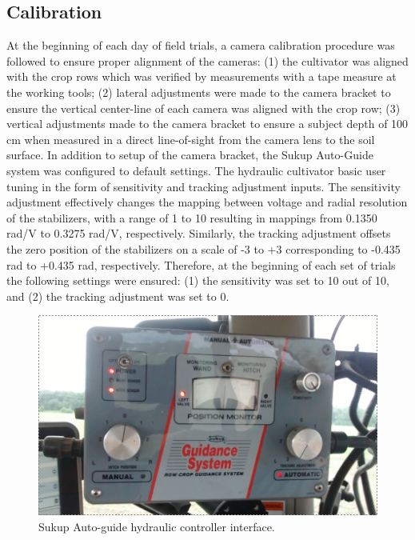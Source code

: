 \documentclass[authoryear]{elsarticle}
\begin{document}
\subsection{Calibration}
At the beginning of each day of field trials, a camera calibration
procedure was followed to ensure proper alignment of the cameras: (1)
the cultivator was aligned with the crop rows which was verified by
measurements with a tape measure at the working tools; (2) lateral
adjustments were made to the camera bracket to ensure the vertical
center-line of each camera was aligned with the crop row; (3) vertical
adjustments made to the camera bracket to ensure a subject depth of
100 cm when measured in a direct line-of-sight from the camera lens to
the soil surface. In addition to setup of the camera bracket, the
Sukup Auto-Guide system was configured to default settings. The
hydraulic cultivator basic user tuning in the form of sensitivity and
tracking adjustment inputs. The sensitivity adjustment effectively
changes the mapping between voltage and radial resolution of the
stabilizers, with a range of 1 to 10 resulting in mappings from 0.1350
rad/V to 0.3275 rad/V, respectively. Similarly, the tracking
adjustment offsets the zero position of the stabilizers on a scale of
-3 to +3 corresponding to -0.435 rad to +0.435 rad,
respectively. Therefore, at the beginning of each set of trials the
following settings were ensured: (1) the sensitivity was set to 10 out
of 10, and (2) the tracking adjustment was set to 0.

\begin{figure}
  \centering
  \includegraphics[scale=0.3,natwidth=610,natheight=642]{sukup.png}
  \caption{Sukup Auto-guide hydraulic controller interface.}
  \label{fig:sukup}
\end{figure}
\end{document}
